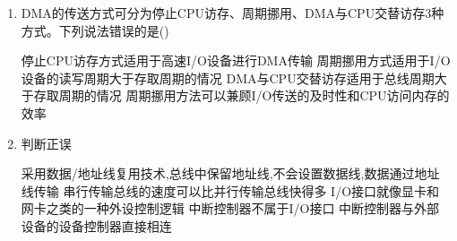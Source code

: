 \documentclass[12pt, a4paper, oneside, UTF8]{ctexbook}
\begin{document}
\begin{enumerate}
    \item DMA的传送方式可分为停止CPU访存、周期挪用、DMA与CPU交替访存3种方式。下列说法错误的是(\qquad)
    \begin{choices}[1]
    \task 停止CPU访存方式适用于高速I/O设备进行DMA传输
    \task 周期挪用方式适用于I/O设备的读写周期大于存取周期的情况
    \task DMA与CPU交替访存适用于总线周期大于存取周期的情况
    \task 周期挪用方法可以兼顾I/O传送的及时性和CPU访问内存的效率
    \end{choices}

    \item 判断正误
    \begin{choices}[1]
        \task 采用数据/地址线复用技术,总线中保留地址线,不会设置数据线,数据通过地址线传输
        \task 串行传输总线的速度可以比并行传输总线快得多
        \task I/O接口就像显卡和网卡之类的一种外设控制逻辑
        \task 中断控制器不属于I/O接口
        \task 中断控制器与外部设备的设备控制器直接相连
    \end{choices}
\end{enumerate}

\newpage
\end{document}
